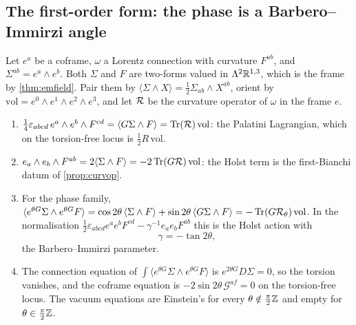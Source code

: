 \subsection{The first-order form: the phase is a Barbero--Immirzi angle}

Let $e^a$ be a coframe, $\omega$ a Lorentz connection with curvature $F^{ab}$, and $\Sigma^{ab}=e^a\wedge e^b$. Both $\Sigma$ and $F$ are two-forms valued in
$\Lambda^2\mathbb{R}^{1,3}$, which is the frame by \cref{thm:emfield}. Pair them by $\langle\Sigma\wedge X\rangle=\tfrac12\Sigma_{ab}\wedge X^{ab}$, orient by
$\mathrm{vol}=e^0\wedge e^1\wedge e^2\wedge e^3$, and let $\mathcal R$ be the curvature operator of $\omega$ in the frame $e$.

\begin{proposition}
\label{prop:holst}
\begin{enumerate}[label=(\roman*),leftmargin=2.2em]
\item $\tfrac14\varepsilon_{abcd}\,e^a\wedge e^b\wedge F^{cd}=\langle G\Sigma\wedge F\rangle=\operatorname{Tr}(\mathcal R)\,\mathrm{vol}$: the Palatini Lagrangian, which on the torsion-free
locus is $\tfrac12R\,\mathrm{vol}$.
\item $e_a\wedge e_b\wedge F^{ab}=2\langle\Sigma\wedge F\rangle=-2\operatorname{Tr}(G\mathcal R)\,\mathrm{vol}$: the Holst term is the first-Bianchi datum of \cref{prop:curvop}.
\item For the phase family, $\langle e^{\theta G}\Sigma\wedge e^{\theta G}F\rangle=\cos2\theta\,\langle\Sigma\wedge F\rangle+\sin2\theta\,\langle G\Sigma\wedge F\rangle=-\operatorname{Tr}(G\mathcal R_\theta)\,\mathrm{vol}$.
In the normalisation $\tfrac12\varepsilon_{abcd}e^ae^bF^{cd}-\gamma^{-1}e_ae_bF^{ab}$ this is the Holst action \cite{Holst96} with
\[
\gamma=-\tan2\theta ,
\]
the Barbero--Immirzi parameter.
\item The connection equation of $\int\langle e^{\theta G}\Sigma\wedge e^{\theta G}F\rangle$ is $e^{2\theta G}D\Sigma=0$, so the torsion vanishes, and the coframe equation is
$-2\sin2\theta\,\mathcal G^{af}=0$ on the torsion-free locus. The vacuum equations are Einstein's for every $\theta\notin\tfrac\pi2\mathbb{Z}$ and empty for $\theta\in\tfrac\pi2\mathbb{Z}$.
\end{enumerate}
\end{proposition}

